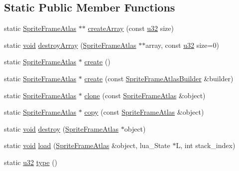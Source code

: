 \subsection*{Static Public Member Functions}
\begin{DoxyCompactItemize}
\item 
static \mbox{\hyperlink{classnjli_1_1_sprite_frame_atlas}{Sprite\+Frame\+Atlas}} $\ast$$\ast$ \mbox{\hyperlink{classnjli_1_1_sprite_frame_atlas_abd9a8d6350ab19df8121b22e85493e4c}{create\+Array}} (const \mbox{\hyperlink{_util_8h_a10e94b422ef0c20dcdec20d31a1f5049}{u32}} size)
\item 
static \mbox{\hyperlink{_thread_8h_af1e856da2e658414cb2456cb6f7ebc66}{void}} \mbox{\hyperlink{classnjli_1_1_sprite_frame_atlas_ab9893ed4aa85eff7606c50b581f6986f}{destroy\+Array}} (\mbox{\hyperlink{classnjli_1_1_sprite_frame_atlas}{Sprite\+Frame\+Atlas}} $\ast$$\ast$array, const \mbox{\hyperlink{_util_8h_a10e94b422ef0c20dcdec20d31a1f5049}{u32}} size=0)
\item 
static \mbox{\hyperlink{classnjli_1_1_sprite_frame_atlas}{Sprite\+Frame\+Atlas}} $\ast$ \mbox{\hyperlink{classnjli_1_1_sprite_frame_atlas_a898fa8f023efd9cbe6c0e7f4fd6a4215}{create}} ()
\item 
static \mbox{\hyperlink{classnjli_1_1_sprite_frame_atlas}{Sprite\+Frame\+Atlas}} $\ast$ \mbox{\hyperlink{classnjli_1_1_sprite_frame_atlas_a93ad01950173257f50571aafa6c5e502}{create}} (const \mbox{\hyperlink{classnjli_1_1_sprite_frame_atlas_builder}{Sprite\+Frame\+Atlas\+Builder}} \&builder)
\item 
static \mbox{\hyperlink{classnjli_1_1_sprite_frame_atlas}{Sprite\+Frame\+Atlas}} $\ast$ \mbox{\hyperlink{classnjli_1_1_sprite_frame_atlas_a71916140cfa625adfe7fed64338dfdd8}{clone}} (const \mbox{\hyperlink{classnjli_1_1_sprite_frame_atlas}{Sprite\+Frame\+Atlas}} \&object)
\item 
static \mbox{\hyperlink{classnjli_1_1_sprite_frame_atlas}{Sprite\+Frame\+Atlas}} $\ast$ \mbox{\hyperlink{classnjli_1_1_sprite_frame_atlas_aa25dd2508eaee217ff393475a736f76e}{copy}} (const \mbox{\hyperlink{classnjli_1_1_sprite_frame_atlas}{Sprite\+Frame\+Atlas}} \&object)
\item 
static \mbox{\hyperlink{_thread_8h_af1e856da2e658414cb2456cb6f7ebc66}{void}} \mbox{\hyperlink{classnjli_1_1_sprite_frame_atlas_aa585303baeeb8d6df78d1ae1acc61c20}{destroy}} (\mbox{\hyperlink{classnjli_1_1_sprite_frame_atlas}{Sprite\+Frame\+Atlas}} $\ast$object)
\item 
static \mbox{\hyperlink{_thread_8h_af1e856da2e658414cb2456cb6f7ebc66}{void}} \mbox{\hyperlink{classnjli_1_1_sprite_frame_atlas_a59d90a34b45854c28cfd4e6cdd66990d}{load}} (\mbox{\hyperlink{classnjli_1_1_sprite_frame_atlas}{Sprite\+Frame\+Atlas}} \&object, lua\+\_\+\+State $\ast$L, int stack\+\_\+index)
\item 
static \mbox{\hyperlink{_util_8h_a10e94b422ef0c20dcdec20d31a1f5049}{u32}} \mbox{\hyperlink{classnjli_1_1_sprite_frame_atlas_a58bec088ea6c0f9b140dcee287826007}{type}} ()
\end{DoxyCompactItemize}
